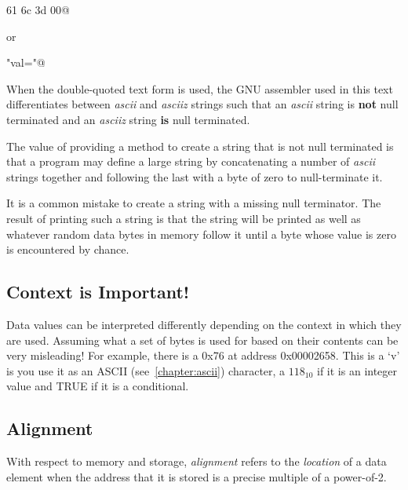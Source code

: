  61 6c 3d 00@

or

\verb@"val="@


When the double-quoted text form is used, the GNU assembler used in 
this text differentiates between {\em ascii} and {\em asciiz} strings
such that an {\em ascii} string is {\bf not} null terminated and an
{\em asciiz} string {\bf is} null terminated.  

The value of providing a method to create a string that is not
null terminated is that a program may define a large string by 
concatenating a number of {\em ascii} strings together and following the 
last with a byte of zero to null-terminate it.

It is a common mistake to create a string with a missing
null terminator.  The result of printing such a string is that
the string will be printed as well as whatever random data bytes in 
memory follow it until a byte whose value is zero is encountered 
by chance.

\subsection{Context is Important!}

Data values can be interpreted differently depending on the context in 
which they are used.  Assuming what a set of bytes is used for based on 
their contents can be very misleading!  For example, there is a 0x76 at 
address 0x00002658.  This is a `v' is you use it as an ASCII 
(see~\autoref{chapter:ascii}) character, a $118_{10}$ if it is an integer 
value and TRUE if it is a conditional.

\subsection{Alignment}

%
With respect to memory and storage, {\em \gls{alignment}} refers to the 
{\em location} of a data element when the address that it is stored is 
a precise multiple of a power-of-2. 

